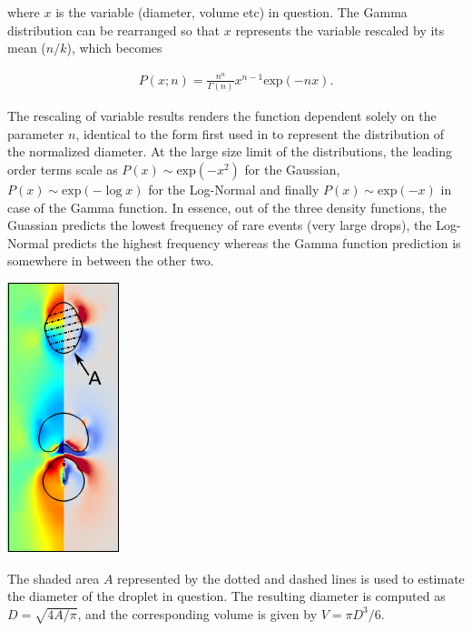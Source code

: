 where $x$ is the variable (diameter, volume etc) in question. 
The Gamma distribution can be rearranged so that $x$ represents
the variable rescaled by its mean ($n / k$), which becomes 

\begin{align}
	P\left( x ; n \right) = \frac{n^{n}}{\Gamma(n)} x^{n-1} \textrm{exp}\left(-n x\right) . 
\end{align}

The rescaling of variable results renders the function dependent solely 
on the parameter $n$, identical to the form first used in \cite{vill_2}
to represent the distribution of the normalized diameter.  
At the large size limit of the distributions, the leading order terms 
scale as $P(x) \sim \textrm{exp}(-x^2)$ for the Gaussian, $P(x) \sim \textrm{exp}(- \log x)$ for 
the Log-Normal and finally $P(x) \sim \textrm{exp}(- x)$ in case of the Gamma function. 
In essence, out of the three density functions, the Guassian predicts the lowest frequency of
rare events (very large drops), the Log-Normal predicts the highest frequency whereas
the Gamma function prediction is somewhere in between the other two. 

\begin{marginfigure}[-1cm]
\centering
\includegraphics{plots/drop_stats/diameter_compute.pdf}
\caption{The shaded area $A$ represented by the dotted and dashed lines
	is used to estimate the diameter of the droplet in question.
	The resulting diameter is computed as $D = \sqrt{4A/\pi}$,
	and the corresponding volume is given by $V = \pi D^3/6$.
	} 
\label{dia_compute}
\end{marginfigure}


